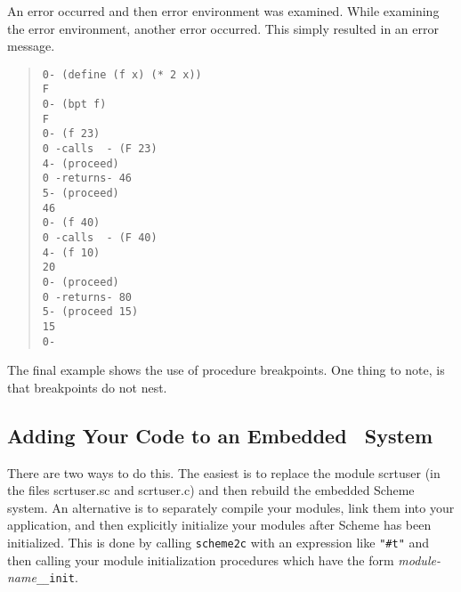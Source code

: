 \documentclass[12pt]{article}
\begin{document}
An error occurred and then error environment was examined.  While
examining the error environment, another error occurred.  This simply
resulted in an error message.
\begin{quote}
\begin{verbatim}
0- (define (f x) (* 2 x))
F
0- (bpt f)
F
0- (f 23)
0 -calls  - (F 23)
4- (proceed)
0 -returns- 46
5- (proceed)
46
0- (f 40)
0 -calls  - (F 40)
4- (f 10)
20
0- (proceed)
0 -returns- 80
5- (proceed 15)
15
0-
\end{verbatim}
\end{quote}
The final example shows the use of procedure breakpoints.  One thing
to note, is that breakpoints do not nest.

\subsection*{Adding Your Code to an Embedded \StoC\ System}

There are two ways to do this.  The easiest is to replace the module
scrtuser (in the files scrtuser.sc and scrtuser.c) and then rebuild
the embedded Scheme system.  An alternative is to separately compile
your modules, link them into your application, and then explicitly
initialize your modules after Scheme has been initialized.  This is
done by calling \texttt{scheme2c} with an expression like
\texttt{"\#t"} and then calling your module initialization procedures
which have the form \emph{module-name}\texttt{\_\_init}.
\end{document}
